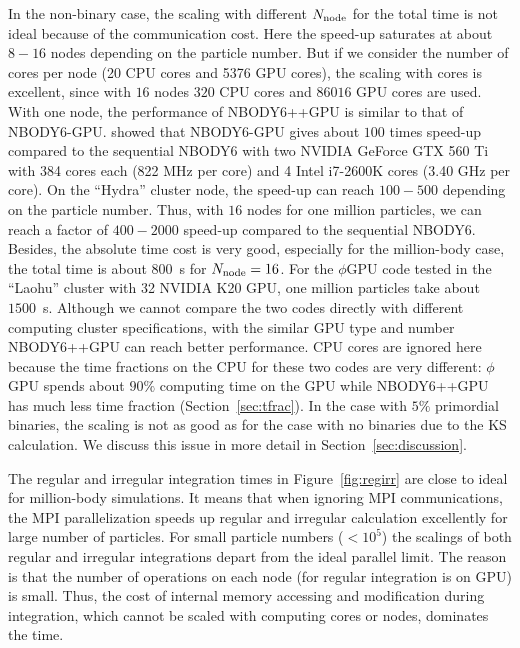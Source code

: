 \documentclass[usenatbib,aas_macros]{mn2e}
\def\nbodyppgpu{NBODY6++GPU }
\begin{document}
In the non-binary case, the scaling with different $N_{\rm node}$ for the total time is not ideal because of the communication cost. 
Here the speed-up saturates at about $8-16$ nodes depending on the particle number.
But if we consider the number of cores per node (20 CPU cores and 5376 GPU cores), the scaling with cores is excellent, since with $16$ nodes $320$ CPU cores and $86016$ GPU cores are used.
With one node, the performance of NBODY6++GPU is similar to that of NBODY6-GPU. \cite{Nitadori2012} showed that NBODY6-GPU gives about $100$ times speed-up compared to the sequential NBODY6 with two NVIDIA GeForce GTX 560 Ti with 384 cores each (822 MHz per core) and 4 Intel i7-2600K cores (3.40 GHz per core). 
On the ``Hydra'' cluster node, the speed-up can reach $100-500$ depending on the particle number. 
Thus, with $16$ nodes for one million particles, we can reach a factor of $400-2000$ speed-up compared to the sequential NBODY6.
Besides, the absolute time cost is very good, especially for the million-body case, the total time is about $800$~s for $N_{\rm node} = 16$. 
For the $\phi$GPU code tested in the ``Laohu'' cluster with 32 NVIDIA K20 GPU, one million particles take about $1500$~s. 
Although we cannot compare the two codes directly with different computing cluster specifications, with the similar GPU type and number \nbodyppgpu can reach better performance.
CPU cores are ignored here because the time fractions on the CPU for these two codes are very different: $\phi$GPU spends about $90\%$ computing time on the GPU while \nbodyppgpu has much less time fraction (Section~\ref{sec:tfrac}).
In the case with $5\%$ primordial binaries, the scaling is not as good as for the case with no binaries due to the KS calculation. We discuss this issue in more detail in Section~\ref{sec:discussion}.

The regular and irregular integration times in Figure~\ref{fig:regirr} are close to ideal for million-body simulations. 
It means that when ignoring MPI communications, the MPI parallelization speeds up regular and irregular calculation excellently for large number of particles.
For small particle numbers ($< 10^5$) the scalings of both regular and irregular integrations depart from the ideal parallel limit.
The reason is that the number of operations on each node (for regular integration is on GPU) is small. 
Thus, the cost of internal memory accessing and modification during integration, which cannot be scaled with computing cores or nodes, dominates the time.
\end{document}
